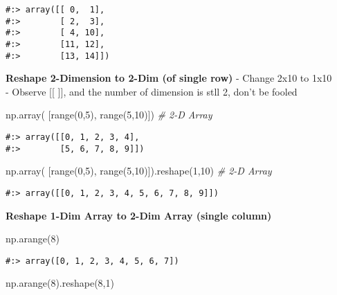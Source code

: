 \documentclass[
]{book}
\newenvironment{Shaded}{\begin{snugshade}}{\end{snugshade}}
\newcommand{\BuiltInTok}[1]{#1}
\newcommand{\CommentTok}[1]{\textcolor[rgb]{0.37,0.37,0.37}{\textit{#1}}}
\newcommand{\DecValTok}[1]{\textcolor[rgb]{0.06,0.06,0.06}{#1}}
\newcommand{\NormalTok}[1]{#1}
\begin{document}
\begin{verbatim}
#:> array([[ 0,  1],
#:>        [ 2,  3],
#:>        [ 4, 10],
#:>        [11, 12],
#:>        [13, 14]])
\end{verbatim}

\textbf{Reshape 2-Dimension to 2-Dim (of single row)} - Change 2x10 to 1x10\\
- Observe {[}{[} {]}{]}, and the number of dimension is stll 2, don't be fooled

\begin{Shaded}
\begin{Highlighting}[]
\NormalTok{np.array( [}\BuiltInTok{range}\NormalTok{(}\DecValTok{0}\NormalTok{,}\DecValTok{5}\NormalTok{), }\BuiltInTok{range}\NormalTok{(}\DecValTok{5}\NormalTok{,}\DecValTok{10}\NormalTok{)])  }\CommentTok{\# 2{-}D Array}
\end{Highlighting}
\end{Shaded}

\begin{verbatim}
#:> array([[0, 1, 2, 3, 4],
#:>        [5, 6, 7, 8, 9]])
\end{verbatim}

\begin{Shaded}
\begin{Highlighting}[]
\NormalTok{np.array( [}\BuiltInTok{range}\NormalTok{(}\DecValTok{0}\NormalTok{,}\DecValTok{5}\NormalTok{), }\BuiltInTok{range}\NormalTok{(}\DecValTok{5}\NormalTok{,}\DecValTok{10}\NormalTok{)]).reshape(}\DecValTok{1}\NormalTok{,}\DecValTok{10}\NormalTok{) }\CommentTok{\# 2{-}D Array}
\end{Highlighting}
\end{Shaded}

\begin{verbatim}
#:> array([[0, 1, 2, 3, 4, 5, 6, 7, 8, 9]])
\end{verbatim}

\textbf{Reshape 1-Dim Array to 2-Dim Array (single column)}

\begin{Shaded}
\begin{Highlighting}[]
\NormalTok{np.arange(}\DecValTok{8}\NormalTok{)}
\end{Highlighting}
\end{Shaded}

\begin{verbatim}
#:> array([0, 1, 2, 3, 4, 5, 6, 7])
\end{verbatim}

\begin{Shaded}
\begin{Highlighting}[]
\NormalTok{np.arange(}\DecValTok{8}\NormalTok{).reshape(}\DecValTok{8}\NormalTok{,}\DecValTok{1}\NormalTok{)}
\end{Highlighting}
\end{Shaded}
\end{document}
